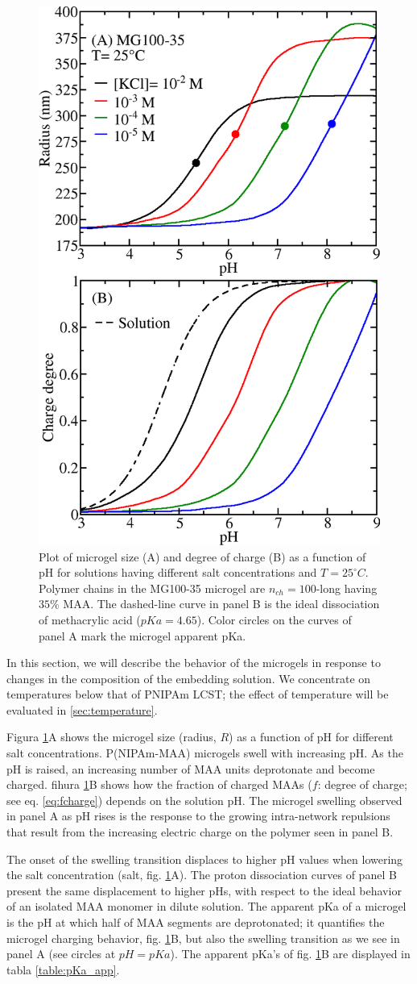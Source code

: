 \begin{figure}[!ht]
\centering
\includegraphics[width=0.5\linewidth]{Figures/graph-gel/R-pH.png}
\caption{Plot of microgel size (A) and degree of charge (B) as a function of pH for solutions having different salt concentrations and $T=25 ^\circ C$.
Polymer chains in the MG100-35 microgel are $n_{ch}=100$-long having $35\% $ MAA.
The dashed-line curve in panel B is the ideal dissociation of methacrylic acid ($pKa=4.65$).
Color circles on the curves of panel A mark the microgel apparent pKa.}
\label{fig:R-pH}
\end{figure}


In this section, we will describe the behavior of the microgels in response to changes in the composition of the embedding solution.
We concentrate on temperatures below that of PNIPAm LCST;
the effect of temperature will be evaluated in \ref{sec:temperature}.

Figura \ref{fig:R-pH}A shows the microgel size (radius, $R$) as a function of pH for different salt concentrations.
P(NIPAm-MAA) microgels swell with increasing pH.
As the pH is raised, an increasing number of MAA units deprotonate and become charged.
fihura \ref{fig:R-pH}B shows how the fraction of charged MAAs ($f$: degree of charge; see eq. \ref{eq:fcharge}) depends on the solution pH.
The microgel swelling observed in panel A as pH rises is the response to the growing intra-network repulsions that result from the increasing electric charge on the polymer seen in panel B.



The onset of the swelling transition displaces to higher pH values when lowering the salt concentration (salt, fig. \ref{fig:R-pH}A).
The proton dissociation curves of panel B present the same displacement to higher pHs, with respect to the ideal behavior of an isolated MAA monomer in dilute solution.
The apparent pKa of a microgel is the pH at which half of MAA segments are deprotonated;
it quantifies the microgel charging behavior, fig. \ref{fig:R-pH}B, but also the swelling transition as we see in panel A (see circles at $pH=pKa$).
The apparent pKa's of fig. \ref{fig:R-pH}B are displayed in tabla \ref{table:pKa_app}.



